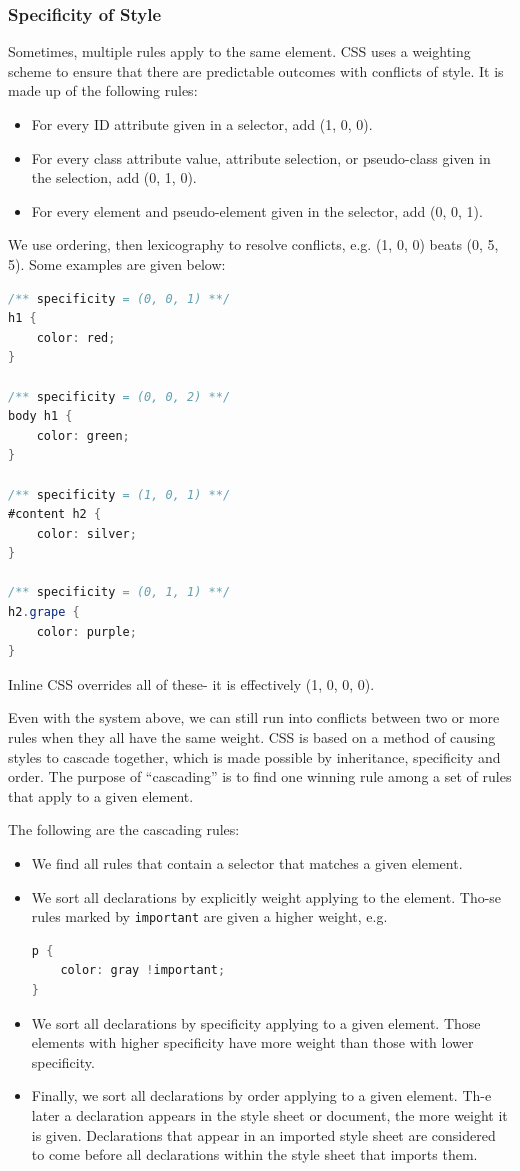 \documentclass[a4paper, openany]{memoir}
\begin{document}
\subsubsection{Specificity of Style}
Sometimes, multiple rules apply to the same element. CSS uses a weighting scheme to ensure that there are predictable outcomes with conflicts of style. It is made up of the following rules:
\begin{itemize}
    \item For every ID attribute given in a selector, add (1, 0, 0). 
    \item For every class attribute value, attribute selection, or pseudo-class given in the selection, add (0, 1, 0).
    \item For every element and pseudo-element given in the selector, add (0, 0, 1).
\end{itemize}
We use ordering, then lexicography to resolve conflicts, e.g. (1, 0, 0) beats (0, 5, 5). Some examples are given below:
\begin{lstlisting}[language=java]
/** specificity = (0, 0, 1) **/
h1 {
    color: red;
}

/** specificity = (0, 0, 2) **/
body h1 {
    color: green;
}

/** specificity = (1, 0, 1) **/
#content h2 {
    color: silver;
}

/** specificity = (0, 1, 1) **/
h2.grape {
    color: purple;
}
\end{lstlisting}
Inline CSS overrides all of these- it is effectively (1, 0, 0, 0).

Even with the system above, we can still run into conflicts between two or more rules when they all have the same weight. CSS is based on a method of causing styles to cascade together, which is made possible by inheritance, specificity and order. The purpose of ``cascading'' is to find one winning rule among a set of rules that apply to a given element.

The following are the cascading rules:
\begin{itemize}
    \item We find all rules that contain a selector that matches a given element.
    \item We sort all declarations by explicitly weight applying to the element. Tho-se rules marked by \texttt{important} are given a higher weight, e.g.
    \begin{lstlisting}[language=java]
p {
    color: gray !important;
}\end{lstlisting}
    \item We sort all declarations by specificity applying to a given element. Those elements with higher specificity have more weight than those with lower specificity.
    \item Finally, we sort all declarations by order applying to a given element. Th-e later a declaration appears in the style sheet or document, the more weight it is given. Declarations that appear in an imported style sheet are considered to come before all declarations within the style sheet that imports them. 
\end{itemize}
\end{document}
